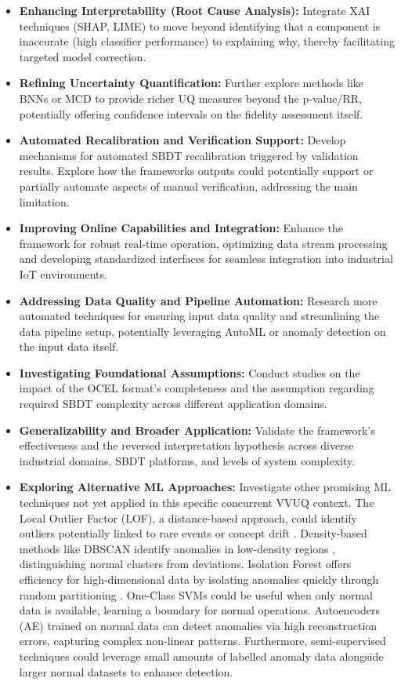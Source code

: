 \begin{itemize}
  \item \textbf{Enhancing Interpretability (Root Cause Analysis):} Integrate XAI techniques (SHAP, LIME) to move beyond identifying that a component is inaccurate (high classifier performance) to explaining why, thereby facilitating targeted model correction.
  \item \textbf{Refining Uncertainty Quantification:} Further explore methods like BNNs or MCD to provide richer UQ measures beyond the p-value/RR, potentially offering confidence intervals on the fidelity assessment itself.
  \item \textbf{Automated Recalibration and Verification Support:} Develop mechanisms for automated SBDT recalibration triggered by validation results. Explore how the frameworks outputs could potentially support or partially automate aspects of manual verification, addressing the main limitation.
  \item \textbf{Improving Online Capabilities and Integration:} Enhance the framework for robust real-time operation, optimizing data stream processing and developing standardized interfaces for seamless integration into industrial IoT environments.
  \item \textbf{Addressing Data Quality and Pipeline Automation:} Research more automated techniques for ensuring input data quality and streamlining the data pipeline setup, potentially leveraging AutoML or anomaly detection on the input data itself.
  \item \textbf{Investigating Foundational Assumptions:} Conduct studies on the impact of the OCEL format's completeness and the assumption regarding required SBDT complexity across different application domains.
  \item \textbf{Generalizability and Broader Application:} Validate the framework's effectiveness and the reversed interpretation hypothesis across diverse industrial domains, SBDT platforms, and levels of system complexity.
  \item \textbf{Exploring Alternative ML Approaches:} Investigate other promising ML techniques not yet applied in this specific concurrent VVUQ context. The Local Outlier Factor (LOF), a distance-based approach, could identify outliers potentially linked to rare events or concept drift \autocite{alghushairy2020review}. Density-based methods like DBSCAN identify anomalies in low-density regions \autocite{ccelik2011anomaly}, distinguishing normal clusters from deviations. Isolation Forest offers efficiency for high-dimensional data by isolating anomalies quickly through random partitioning \autocite{xu2017improved}. One-Class SVMs \autocite{li2003improving} could be useful when only normal data is available, learning a boundary for normal operations. Autoencoders (AE) \autocite{zhou2017anomaly} trained on normal data can detect anomalies via high reconstruction errors, capturing complex non-linear patterns. Furthermore, semi-supervised techniques could leverage small amounts of labelled anomaly data alongside larger normal datasets to enhance detection.

\end{itemize}
